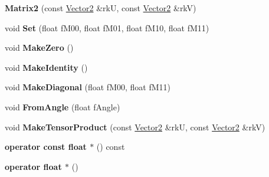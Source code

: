 \begin{DoxyCompactItemize}
\item 
{\bfseries Matrix2} (const \hyperlink{class_magnum_1_1_vector2}{Vector2} \&rkU, const \hyperlink{class_magnum_1_1_vector2}{Vector2} \&rkV)\hypertarget{class_magnum_1_1_matrix2_a2f93bdb41aaebc0c87c125c2b0285f82}{}\label{class_magnum_1_1_matrix2_a2f93bdb41aaebc0c87c125c2b0285f82}

\item 
void {\bfseries Set} (float f\+M00, float f\+M01, float f\+M10, float f\+M11)\hypertarget{class_magnum_1_1_matrix2_a7e1f86bfd82308b20621ee4e39b8194d}{}\label{class_magnum_1_1_matrix2_a7e1f86bfd82308b20621ee4e39b8194d}

\item 
void {\bfseries Make\+Zero} ()\hypertarget{class_magnum_1_1_matrix2_aedbe2b41f680634f2baad786ca8503b4}{}\label{class_magnum_1_1_matrix2_aedbe2b41f680634f2baad786ca8503b4}

\item 
void {\bfseries Make\+Identity} ()\hypertarget{class_magnum_1_1_matrix2_a680a1823681841616bf42ed201820860}{}\label{class_magnum_1_1_matrix2_a680a1823681841616bf42ed201820860}

\item 
void {\bfseries Make\+Diagonal} (float f\+M00, float f\+M11)\hypertarget{class_magnum_1_1_matrix2_a16b3d0b8dcc379f4c9c1dbb567d4b4f9}{}\label{class_magnum_1_1_matrix2_a16b3d0b8dcc379f4c9c1dbb567d4b4f9}

\item 
void {\bfseries From\+Angle} (float f\+Angle)\hypertarget{class_magnum_1_1_matrix2_a0c009a75446358d1d9b4ca52c6ff624a}{}\label{class_magnum_1_1_matrix2_a0c009a75446358d1d9b4ca52c6ff624a}

\item 
void {\bfseries Make\+Tensor\+Product} (const \hyperlink{class_magnum_1_1_vector2}{Vector2} \&rkU, const \hyperlink{class_magnum_1_1_vector2}{Vector2} \&rkV)\hypertarget{class_magnum_1_1_matrix2_a325bf6e4cfca04666ba2b89d147a8d42}{}\label{class_magnum_1_1_matrix2_a325bf6e4cfca04666ba2b89d147a8d42}

\item 
{\bfseries operator const float $\ast$} () const \hypertarget{class_magnum_1_1_matrix2_a7ce0c2fba833af70aaabf4e4ec660a95}{}\label{class_magnum_1_1_matrix2_a7ce0c2fba833af70aaabf4e4ec660a95}

\item 
{\bfseries operator float $\ast$} ()\hypertarget{class_magnum_1_1_matrix2_ae8d83d33e82edca34df54dd404793c58}{}\label{class_magnum_1_1_matrix2_ae8d83d33e82edca34df54dd404793c58}


\end{DoxyCompactItemize}
